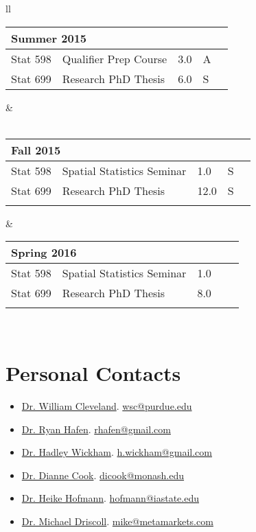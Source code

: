 \documentclass[oneside]{article}
\newcommand{\semtable}[1]{
  \begin{tabular}{p{1.5cm} p{3.5cm} p{.3cm} p{.3cm} p{0.75cm}}
    \multicolumn{5}{l}{#1}\\
    \hline
}
\newcommand{\semtableend}{
  \\
  \end{tabular}
}
\begin{document}
{\begin{tabular}{ll}
    \semtable{Summer 2015}
      Stat 598 & Qualifier Prep Course & 3.0 & A & \\
      Stat 699 & Research PhD Thesis & 6.0 & S &
    \semtableend
    &
    \\
	\\



    \semtable{Fall 2015}
      Stat 598 & Spatial Statistics Seminar & 1.0 & S & \\
      Stat 699 & Research PhD Thesis & 12.0 & S & \\
    \semtableend
    &
    \semtable{Spring 2016}
      Stat 598 & Spatial Statistics Seminar & 1.0 &  & \\
      Stat 699 & Research PhD Thesis & 8.0 &  & \\
    \semtableend
    \\



  \end{tabular}
} %


\section{Personal Contacts}

  \begin{itemize}

    \item \href{http://www.stat.purdue.edu/~wsc/}{Dr. William Cleveland}. \href{mailto:wsc@purdue.edu}{wsc@purdue.edu}

    \item \href{http://ryanhafen.com/}{Dr. Ryan Hafen}. \href{mailto:r.hafen@gmail.com}{rhafen@gmail.com}

    \item \href{http://had.co.nz/}{Dr. Hadley Wickham}.  \href{mailto:h.wickham@gmail.com}{h.wickham@gmail.com}

    \item \href{http://dicook.github.io/}{Dr. Dianne Cook}.  \href{mailto:dicook@monash.edu}{dicook@monash.edu}

    \item \href{https://github.com/heike}{Dr. Heike Hofmann}.  \href{mailto:hofmann@iastate.edu}{hofmann@iastate.edu}

    \item \href{https://www.linkedin.com/profile/view?id=413949}{Dr. Michael Driscoll}. \href{mailto:mike@metamarkets.com}{mike@metamarkets.com}

  \end{itemize}
\end{document}
